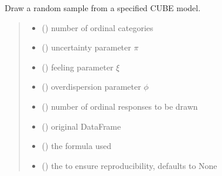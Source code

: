 \documentclass[letterpaper,10pt,english]{sphinxmanual}
\begin{document}
\begin{fulllineitems}
\label{\detokenize{cubmods:cubmods.cube.draw}}
\pysigstartsignatures
{}
\pysigstopsignatures
\sphinxAtStartPar
Draw a random sample from a specified CUBE model.
\begin{quote}\begin{description}
\begin{itemize}
\item {} 
\sphinxAtStartPar
{} () \textendash{} number of ordinal categories

\item {} 
\sphinxAtStartPar
{} () \textendash{} uncertainty parameter \(\pi\)

\item {} 
\sphinxAtStartPar
{} () \textendash{} feeling parameter \(\xi\)

\item {} 
\sphinxAtStartPar
{} () \textendash{} overdispersion parameter \(\phi\)

\item {} 
\sphinxAtStartPar
{} () \textendash{} number of ordinal responses to be drawn

\item {} 
\sphinxAtStartPar
{} () \textendash{} original DataFrame

\item {} 
\sphinxAtStartPar
{} () \textendash{} the formula used

\item {} 
\sphinxAtStartPar
{} (\sphinxstyleliteralemphasis{\sphinxupquote{, }}) \textendash{} the  to ensure reproducibility, defaults to None


\end{itemize}
\end{description}
\end{quote}
\end{fulllineitems}
\end{document}
